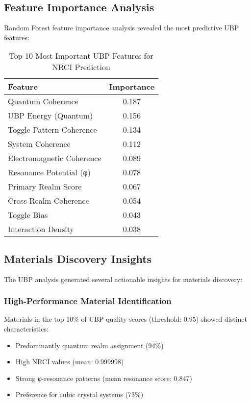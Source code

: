 \documentclass[12pt,a4paper]{article}
\begin{document}
\subsection{Feature Importance Analysis}

Random Forest feature importance analysis revealed the most predictive UBP features:

\begin{table}[H]
\centering
\caption{Top 10 Most Important UBP Features for NRCI Prediction}
\label{tab:feature_importance}
\begin{tabular}{@{}lc@{}}
\toprule
\textbf{Feature} & \textbf{Importance} \\
\midrule
Quantum Coherence & 0.187 \\
UBP Energy (Quantum) & 0.156 \\
Toggle Pattern Coherence & 0.134 \\
System Coherence & 0.112 \\
Electromagnetic Coherence & 0.089 \\
Resonance Potential (φ) & 0.078 \\
Primary Realm Score & 0.067 \\
Cross-Realm Coherence & 0.054 \\
Toggle Bias & 0.043 \\
Interaction Density & 0.038 \\
\bottomrule
\end{tabular}
\end{table}

\subsection{Materials Discovery Insights}

The UBP analysis generated several actionable insights for materials discovery:

\subsubsection{High-Performance Material Identification}
Materials in the top 10\% of UBP quality scores (threshold: 0.95) showed distinct characteristics:
\begin{itemize}
    \item Predominantly quantum realm assignment (94\%)
    \item High NRCI values (mean: 0.999998)
    \item Strong φ-resonance patterns (mean resonance score: 0.847)
    \item Preference for cubic crystal systems (73\%)
\end{itemize}
\end{document}
